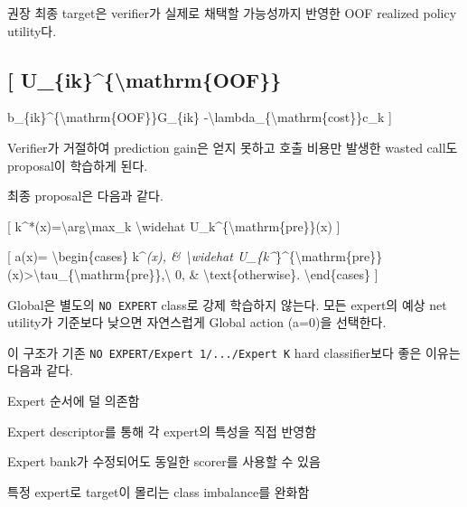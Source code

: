 권장 최종 target은 verifier가 실제로 채택할 가능성까지 반영한 OOF realized policy utility다.

\subsection{[ U\_\allowbreak{}\{ik\}\textasciicircum{}\{\textbackslash{}mathrm\{OOF\}\}}
b\_\allowbreak{}\{ik\}\textasciicircum{}\{\textbackslash{}mathrm\{OOF\}\}G\_\allowbreak{}\{ik\} -\textbackslash{}lambda\_\allowbreak{}\{\textbackslash{}mathrm\{cost\}\}c\_\allowbreak{}k ]

Verifier가 거절하여 prediction gain은 얻지 못하고 호출 비용만 발생한 wasted call도 proposal이 학습하게 된다.

최종 proposal은 다음과 같다.

[ k\textasciicircum{}*(x)=\allowbreak{}\textbackslash{}arg\textbackslash{}max\_\allowbreak{}k \textbackslash{}widehat U\_\allowbreak{}k\textasciicircum{}\{\textbackslash{}mathrm\{pre\}\}(x) ]

[ a(x)=\allowbreak{} \textbackslash{}begin\{cases\} k\textasciicircum{}\emph{(x), \& \textbackslash{}widehat U\_\allowbreak{}\{k\textasciicircum{}}\}\textasciicircum{}\{\textbackslash{}mathrm\{pre\}\}(x)>\textbackslash{}tau\_\allowbreak{}\{\textbackslash{}mathrm\{pre\}\},\textbackslash{} 0, \& \textbackslash{}text\{otherwise\}. \textbackslash{}end\{cases\} ]

Global은 별도의 \texttt{NO EXPER\allowbreak{}T} class로 강제 학습하지 않는다. 모든 expert의 예상 net utility가 기준보다 낮으면 자연스럽게 Global action (a=\allowbreak{}0)을 선택한다.

이 구조가 기존 \texttt{NO EXPER\allowbreak{}T/\allowbreak{}\allowbreak{}Expert\allowbreak{} 1/\allowbreak{}\allowbreak{}.\allowbreak{}.\allowbreak{}.\allowbreak{}/\allowbreak{}\allowbreak{}E\allowbreak{}xpert K} hard classifier보다 좋은 이유는 다음과 같다.

\par\noindent \textbullet\enspace Expert 순서에 덜 의존함


\par\noindent \textbullet\enspace Expert descriptor를 통해 각 expert의 특성을 직접 반영함


\par\noindent \textbullet\enspace Expert bank가 수정되어도 동일한 scorer를 사용할 수 있음


\par\noindent \textbullet\enspace 특정 expert로 target이 몰리는 class imbalance를 완화함


